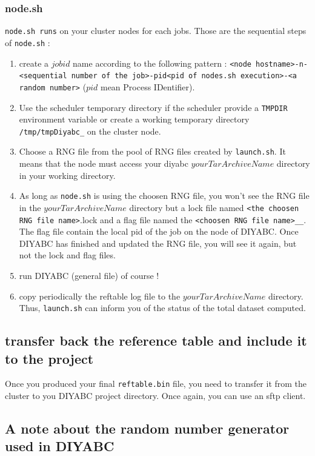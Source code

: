 \subsubsection{node.sh}
\texttt{node.sh runs} on your cluster nodes for each jobs. Those are the sequential steps of \texttt{node.sh} :
\begin{enumerate}
    \item create a $job id$ name according to the following pattern : \texttt{<node hostname>-n-<sequential number of the job>-pid<pid of nodes.sh execution>-<a random number>} ($pid$ mean Process IDentifier).
    \item Use the scheduler temporary directory if the scheduler provide a \texttt{TMPDIR} environment variable or create a working temporary directory \texttt{/tmp/tmpDiyabc\_<job id>} on the cluster node.
    \item Choose a RNG file from the pool of RNG files created by \texttt{launch.sh}. It means that the node must access your diyabc $yourTarArchiveName$ directory in your working directory. 
    \item As long as \texttt{node.sh} is using the choosen RNG file, you won't see the RNG file in the $yourTarArchiveName$ directory but a lock file named \texttt{<the choosen RNG file name>}.lock and a flag file named the \texttt{<choosen RNG file name>\_<date of the run>\_<job id>}. The flag file contain the local pid of the job on the node of DIYABC. Once DIYABC has finished and updated the RNG file, you will see it again, but not the lock and flag files.
    \item run DIYABC (general file) of course !
    \item copy periodically the reftable log file to the $yourTarArchiveName$ directory. Thus, \texttt{launch.sh} can inform you of the status of the total dataset computed.
\end{enumerate}



\subsection{transfer back the reference table and include it to the project}\label{clusterback}
Once you produced your final \texttt{reftable.bin} file, you need to transfer it from the cluster to you DIYABC project directory. Once again, you can use an sftp client.


\clearpage
\subsection{A note about the random number generator used in DIYABC}\label{rng}



  
